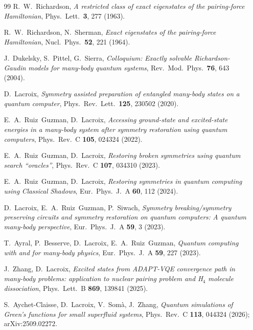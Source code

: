 \documentclass[
  aps,            %
  prc,            %
  reprint,        %
  superscriptaddress,
  floatfix,
  nofootinbib
]{revtex4-2}
\begin{document}
\begin{thebibliography}{99}
R.~W.~Richardson,
\textit{A restricted class of exact eigenstates of the pairing-force Hamiltonian},
Phys.\ Lett.\ \textbf{3}, 277 (1963).

R.~W.~Richardson, N.~Sherman,
\textit{Exact eigenstates of the pairing-force Hamiltonian},
Nucl.\ Phys.\ \textbf{52}, 221 (1964).

J.~Dukelsky, S.~Pittel, G.~Sierra,
\textit{Colloquium: Exactly solvable Richardson-Gaudin models for many-body
quantum systems},
Rev.\ Mod.\ Phys.\ \textbf{76}, 643 (2004).

D.~Lacroix,
\textit{Symmetry assisted preparation of entangled many-body states on a quantum computer},
Phys.\ Rev.\ Lett.\ \textbf{125}, 230502 (2020).

E.~A.~Ruiz~Guzman, D.~Lacroix,
\textit{Accessing ground-state and excited-state energies in a many-body system after symmetry restoration using quantum computers},
Phys.\ Rev.\ C \textbf{105}, 024324 (2022).

E.~A.~Ruiz~Guzman, D.~Lacroix,
\textit{Restoring broken symmetries using quantum search ``oracles''},
Phys.\ Rev.\ C \textbf{107}, 034310 (2023).

E.~A.~Ruiz~Guzman, D.~Lacroix,
\textit{Restoring symmetries in quantum computing using Classical Shadows},
Eur.\ Phys.\ J.\ A \textbf{60}, 112 (2024).

D.~Lacroix, E.~A.~Ruiz~Guzman, P.~Siwach,
\textit{Symmetry breaking/symmetry preserving circuits and symmetry restoration on quantum computers: A quantum many-body perspective},
Eur.\ Phys.\ J.\ A \textbf{59}, 3 (2023).

T.~Ayral, P.~Besserve, D.~Lacroix, E.~A.~Ruiz~Guzman,
\textit{Quantum computing with and for many-body physics},
Eur.\ Phys.\ J.\ A \textbf{59}, 227 (2023).

J.~Zhang, D.~Lacroix,
\textit{Excited states from ADAPT-VQE convergence path in many-body problems: application to nuclear pairing problem and H$_4$ molecule dissociation},
Phys.\ Lett.\ B \textbf{869}, 139841 (2025).

S.~Aychet-Claisse, D.~Lacroix, V.~Som\`a, J.~Zhang,
\textit{Quantum simulations of Green's functions for small superfluid systems},
Phys.\ Rev.\ C \textbf{113}, 044324 (2026); arXiv:2509.02272.


\end{thebibliography}
\end{document}

